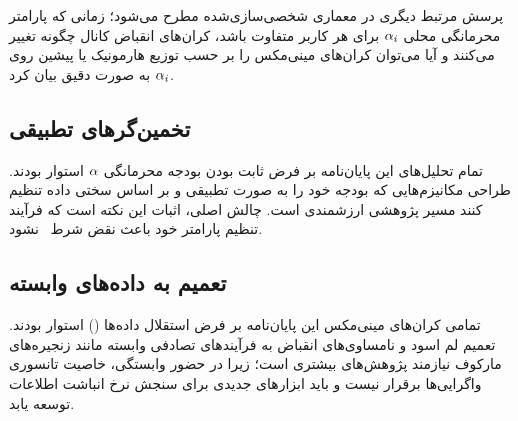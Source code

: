 پرسش مرتبط دیگری در معماری شخصی‌سازی‌شده مطرح می‌شود؛ زمانی که پارامتر محرمانگی محلی $\alpha_i$ برای هر کاربر متفاوت باشد، کران‌های انقباض کانال چگونه تغییر می‌کنند و آیا می‌توان کران‌های مینی‌مکس را بر حسب توزیع هارمونیک یا پیشین روی $\alpha_i$ به صورت دقیق بیان کرد.

\subsection{تخمین‌گرهای تطبیقی}
تمام تحلیل‌های این پایان‌نامه بر فرض ثابت بودن بودجه محرمانگی $\alpha$ استوار بودند. طراحی مکانیزم‌هایی که بودجه خود را به صورت تطبیقی و بر اساس سختی داده تنظیم کنند مسیر پژوهشی ارزشمندی است. چالش اصلی، اثبات این نکته است که فرآیند تنظیم پارامتر خود باعث نقض شرط \LDP\ نشود.

\subsection{تعمیم به داده‌های وابسته}
تمامی کران‌های مینی‌مکس این پایان‌نامه بر فرض استقلال داده‌ها () استوار بودند. تعمیم لم اسود و نامساوی‌های انقباض به فرآیندهای تصادفی وابسته مانند زنجیره‌های مارکوف نیازمند پژوهش‌های بیشتری است؛ زیرا در حضور وابستگی، خاصیت تانسوری واگرایی‌ها برقرار نیست و باید ابزارهای جدیدی برای سنجش نرخ انباشت اطلاعات توسعه یابد.